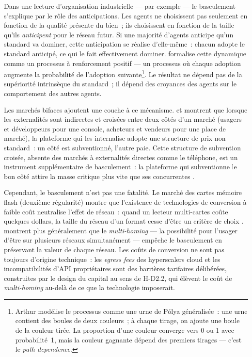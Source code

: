 Dans une lecture d'organisation industrielle --- par exemple \textcite{katz_network_1985} --- le basculement s'explique par le rôle des anticipations. Les agents ne choisissent pas seulement en fonction de la qualité présente du bien~; ils choisissent en fonction de la taille qu'ils \emph{anticipent} pour le réseau futur. Si une majorité d'agents anticipe qu'un standard va dominer, cette anticipation se réalise d'elle-même~: chacun adopte le standard anticipé, ce qui le fait effectivement dominer. \textcite{arthur_competing_1989} formalise cette dynamique comme un processus à renforcement positif --- un processus où chaque adoption augmente la probabilité de l'adoption suivante\footnote{Arthur modélise le processus comme une urne de Pólya généralisée~: une urne contient des boules de deux couleurs~; à chaque tirage, on ajoute une boule de la couleur tirée. La proportion d'une couleur converge vers 0 ou 1 avec probabilité~1, mais la couleur gagnante dépend des premiers tirages --- c'est le \emph{path dependence}.}. Le résultat ne dépend pas de la supériorité intrinsèque du standard~; il dépend des croyances des agents sur le comportement des autres agents.

Les marchés bifaces ajoutent une couche à ce mécanisme. \textcite{rochet_platform_2003} et \textcite{armstrong_competition_2006} montrent que lorsque les externalités sont indirectes et croisées entre deux côtés d'un marché (usagers et développeurs pour une console, acheteurs et vendeurs pour une place de marché), la plateforme qui les internalise adopte une structure de prix non standard~: un côté est subventionné, l'autre paie. Cette structure de subvention croisée, absente des marchés à externalités directes comme le téléphone, est un instrument supplémentaire de basculement~: la plateforme qui subventionne le bon côté attire la masse critique plus vite que ses concurrentes \parencite{rysman_economics_2009}.

Cependant, le basculement n'est pas une fatalité. Le marché des cartes mémoire flash (deuxième régularité) montre que l'existence de technologies de conversion à faible coût neutralise l'effet de réseau~: quand un lecteur multi-cartes coûte quelques dollars, la taille du réseau d'un format cesse d'être un critère de choix \parencite{liu_standards_2012}. \textcite{jullien_economics_2021} montrent plus généralement que le \emph{multi-homing} --- la possibilité pour l'usager d'être sur plusieurs réseaux simultanément --- empêche le basculement en préservant la valeur de chaque réseau. Les coûts de conversion ne sont pas toujours d'origine technique~: les \emph{egress fees} des hyperscalers cloud et les incompatibilités d'API propriétaires sont des barrières tarifaires délibérées, construites par le design du capital au sens de H-D2.2, qui élèvent le coût de \emph{multi-homing} au-delà de ce que la technologie imposerait.

